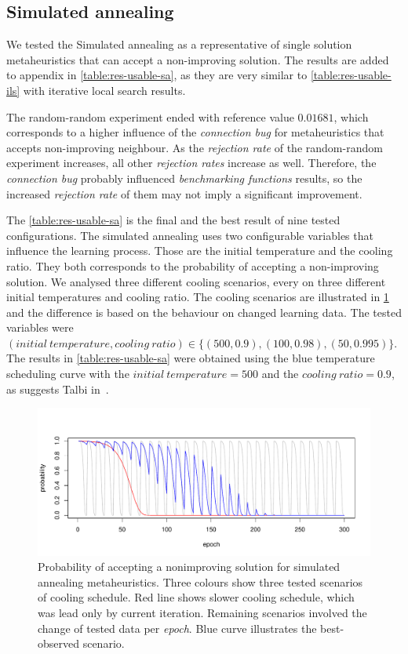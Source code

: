 \documentclass[
  print, %
  Table,   %
  nolof,     %
  nolot,     %
  11pt, %
  oneside  %
]{fithesis3}
\begin{document}
\subsection{Simulated annealing}
\label{subsec:res-ss-sa}

We tested the Simulated annealing as a representative of single solution metaheuristics that can accept a non-improving solution. The results are added to appendix in \cref{table:res-usable-sa}, as they are very similar to \cref{table:res-usable-ils} with iterative local search results.

The random-random experiment ended with reference value $0.01681$, which corresponds to a higher influence of the \textit{connection bug} for metaheuristics that accepts non-improving neighbour. As the \textit{rejection rate} of the random-random experiment increases, all other \textit{rejection rates} increase as well. Therefore, the \textit{connection bug} probably influenced \textit{benchmarking functions} results, so the increased \textit{rejection rate} of them may not imply a significant improvement.

The \cref{table:res-usable-sa} is the final and the best result of nine tested configurations. The simulated annealing uses two configurable variables that influence the learning process. Those are the initial temperature and the cooling ratio. They both corresponds to the probability of accepting a non-improving solution. We analysed three different cooling scenarios, every on three different initial temperatures and cooling ratio. The cooling scenarios are illustrated in \cref{fig:sa-cooling-scenarios} and the difference is based on the behaviour on changed learning data. The tested variables were $(\mathit{initial~temperature, cooling~ratio}) \in \{ (500, 0.9), (100, 0.98), (50, 0.995) \}$. The results in \cref{table:res-usable-sa} were obtained using the blue temperature scheduling curve with the $\mathit{initial~temperature} = 500$ and the $\mathit{cooling~ratio} = 0.9$, as suggests Talbi in~\cite{talbi2009metaheuristics}.

\begin{figure}
\centering
    \includegraphics[width=\textwidth]{./graphics/sa_prob}
    \caption{Probability of accepting a nonimproving solution for simulated annealing metaheuristics. Three colours show three tested scenarios of cooling schedule. Red line shows slower cooling schedule, which was lead only by current iteration. Remaining scenarios involved the change of tested data per \textit{epoch}. Blue curve illustrates the best-observed scenario.}
\label{fig:sa-cooling-scenarios}
\end{figure}
\end{document}

